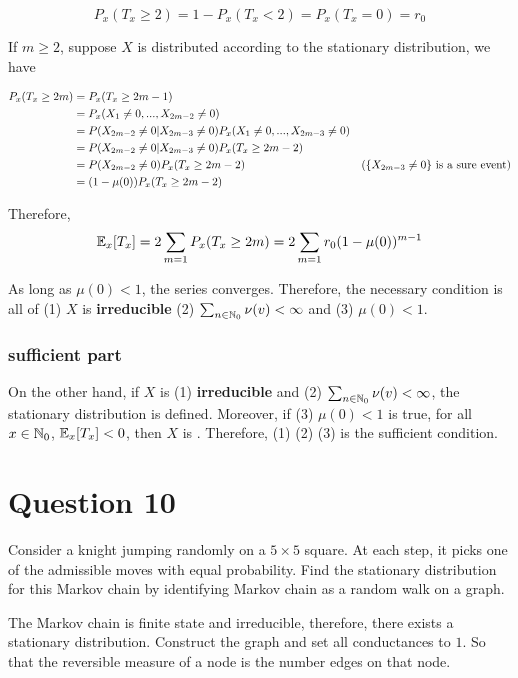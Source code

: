 \documentclass{article}
\begin{document}
$$
    P_x(T_x \geq 2) = 1 - P_x(T_x < 2) = P_x(T_x = 0) = r_0
$$

If $m \geq 2$, suppose $X$ is distributed according to the stationary distribution, we have

\begin{align*}
    P_x(T_x \geq 2m)
    &= P_x(T_x \geq 2m-1) \\
    &= P_x(X_1 \neq 0, ..., X_{2m-2} \neq 0) \\
    &= P(X_{2m-2} \neq 0 | X_{2m-3} \neq 0) P_x(X_1 \neq 0, ..., X_{2m-3} \neq 0) \\
    &= P(X_{2m-2} \neq 0 | X_{2m-3} \neq 0) P_x(T_x \geq 2m-2) \\
    &= P(X_{2m-2} \neq 0) P_x(T_x \geq 2m-2) &\text{($\{X_{2m-3} \neq 0\}$ is a sure event)}\\
    &= (1 - \mu(0)) P_x(T_x \geq 2m-2)
\end{align*}

Therefore,
$$
    \mathbb{E}_x[T_x] = 2 \sum_{m=1} P_x(T_x \geq 2m) = 2 \sum_{m=1} r_0 (1 - \mu(0))^{m-1}
$$

As long as $\mu(0) < 1$, the series converges. Therefore, the necessary condition
is all of (1) $X$ is \textbf{irreducible} (2) $\sum_{n \in \mathbb{N}_0} \nu(v) < \infty$ and (3) $\mu(0) < 1$.

\subsubsection{sufficient part}

On the other hand, if $X$ is (1) \textbf{irreducible} and (2) $\sum_{n \in \mathbb{N}_0} \nu(v) < \infty$, the stationary distribution is defined. Moreover, if (3) $\mu(0) < 1$ is true, for all $x \in \mathbb{N}_0$, $\mathbb{E}_x[T_x] < 0$, then $X$ is . Therefore, (1) (2) (3) is the sufficient condition.

\section{Question 10}
Consider a knight jumping randomly on a $5 \times 5$ square. At each step, it picks one of the admissible moves with equal probability. Find the stationary distribution for this Markov chain by identifying Markov chain as a random walk on a graph.

The Markov chain is finite state and irreducible, therefore, there exists a stationary distribution. Construct the graph and set all conductances to $1$. So that the reversible measure of a node is the number edges on that node.
\end{document}
